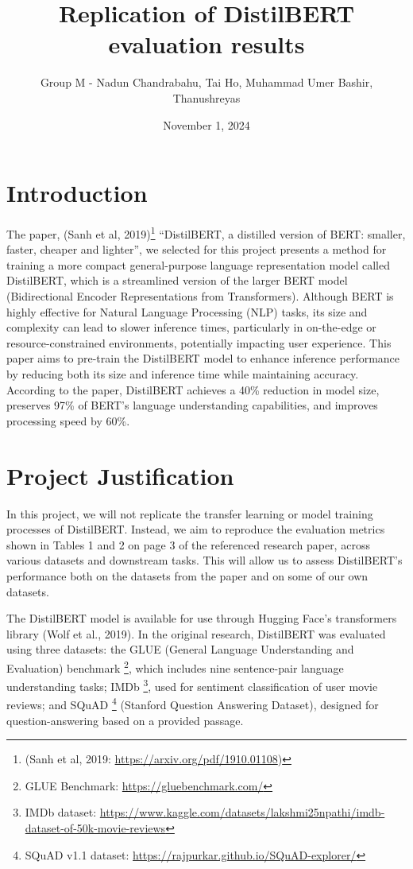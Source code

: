 \documentclass[
  11pt,
]{article}
\title{Replication of DistilBERT evaluation results}
\author{Group M - Nadun Chandrabahu, Tai Ho, Muhammad Umer Bashir,
Thanushreyas}
\date{November 1, 2024}
\begin{document}
\maketitle

\section{Introduction}\label{introduction}

The paper, (Sanh et al, 2019)\footnote{(Sanh et al, 2019:
  \url{https://arxiv.org/pdf/1910.01108})} ``DistilBERT, a distilled
version of BERT: smaller, faster, cheaper and lighter'', we selected for
this project presents a method for training a more compact
general-purpose language representation model called DistilBERT, which
is a streamlined version of the larger BERT model (Bidirectional Encoder
Representations from Transformers). Although BERT is highly effective
for Natural Language Processing (NLP) tasks, its size and complexity can
lead to slower inference times, particularly in on-the-edge or
resource-constrained environments, potentially impacting user
experience. This paper aims to pre-train the DistilBERT model to enhance
inference performance by reducing both its size and inference time while
maintaining accuracy. According to the paper, DistilBERT achieves a 40\%
reduction in model size, preserves 97\% of BERT's language understanding
capabilities, and improves processing speed by 60\%.

\section{Project Justification}\label{project-justification}

In this project, we will not replicate the transfer learning or model
training processes of DistilBERT. Instead, we aim to reproduce the
evaluation metrics shown in Tables 1 and 2 on page 3 of the referenced
research paper, across various datasets and downstream tasks. This will
allow us to assess DistilBERT's performance both on the datasets from
the paper and on some of our own datasets.

The DistilBERT model is available for use through Hugging Face's
transformers library (Wolf et al., 2019). In the original research,
DistilBERT was evaluated using three datasets: the GLUE (General
Language Understanding and Evaluation) benchmark \footnote{GLUE
  Benchmark: \url{https://gluebenchmark.com/}}, which includes nine
sentence-pair language understanding tasks; IMDb \footnote{IMDb dataset:
  \url{https://www.kaggle.com/datasets/lakshmi25npathi/imdb-dataset-of-50k-movie-reviews}},
used for sentiment classification of user movie reviews; and SQuAD
\footnote{SQuAD v1.1 dataset:
  \url{https://rajpurkar.github.io/SQuAD-explorer/}} (Stanford Question
Answering Dataset), designed for question-answering based on a provided
passage.
\end{document}
